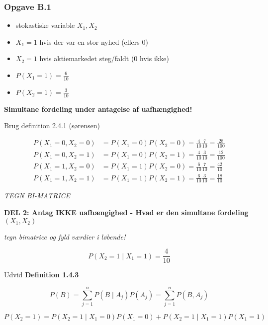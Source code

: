 \subsubsection{Opgave B.1}

\begin{itemize}
    \item stokastiske variable $X_1, X_2$
    \item $X_1 = 1$ hvis der var en stor nyhed (ellers 0)
    \item $X_2 = 1$ hvis aktiemarkedet steg/faldt (0 hvis ikke)
    \item $P(X_1 = 1) = \frac{6}{10}$
    \item $P(X_2 = 1) = \frac{3}{10}$
\end{itemize}

\textbf{Simultane fordeling under antagelse af uafhængighed!}

Brug definition 2.4.1 (sørensen)

\begin{align}
    P(X_1 = 0, X_2 = 0) &= P(X_1=0)P(X_2 = 0) = \frac{4}{10} \frac{7}{10} = \frac{28}{100} \\
    P(X_1 = 0, X_2 = 1) &= P(X_1=0)P(X_2=1) = \frac{4}{10}\frac{3}{10} = \frac{12}{100} \\
    P(X_1 = 1, X_2 = 0) &= P(X_1=1)P(X_2=0) = \frac{6}{10}\frac{7}{10} = \frac{42}{10} \\
    P(X_1 = 1, X_2 = 1) &= P(X_1 =1 )P(X_2 = 1) = \frac{6}{10}\frac{3}{10} = \frac{18}{10}
\end{align}

\textit{TEGN BI-MATRICE}

\textbf{DEL 2: Antag IKKE uafhængighed - Hvad er den simultane fordeling $(X_1, X_2)$}

\textit{tegn bimatrice og fyld værdier i løbende!}

\begin{equation}
    P(X_2 = 1 \mid X_1 = 1) = \frac{4}{10}
\end{equation}

Udvid \textbf{Definition 1.4.3}

\begin{equation}
    P(B) = \sum_{j=1}^n P(B \mid A_j)P(A_j) = \sum_{j=1}^n P(B, A_j)
\end{equation}

\begin{equation}
    P(X_2 = 1) = P(X_2 = 1 \mid X_1 =0)P(X_1 = 0) + P(X_2 = 1 \mid X_1 = 1) P(X_1 = 1)  
\end{equation}

